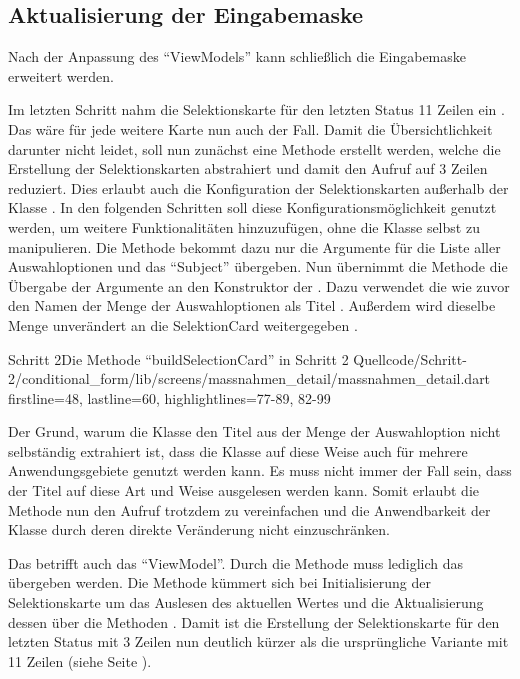 \subsection{Aktualisierung der Eingabemaske}

Nach der Anpassung des \enquote{ViewModels} kann schließlich die Eingabemaske erweitert werden.

Im letzten Schritt nahm die Selektionskarte für den letzten Status 11 Zeilen ein . 
Das wäre für jede weitere Karte nun auch der Fall.
Damit die Übersichtlichkeit darunter nicht leidet, soll nun zunächst eine Methode erstellt werden, welche die Erstellung der Selektionskarten abstrahiert und damit den Aufruf auf 3 Zeilen reduziert.
Dies erlaubt auch die Konfiguration der Selektionskarten außerhalb der Klasse .
In den folgenden Schritten soll diese Konfigurationsmöglichkeit genutzt werden, um weitere Funktionalitäten hinzuzufügen, ohne die Klasse selbst zu manipulieren.
Die Methode  bekommt dazu nur die Argumente für die Liste aller Auswahloptionen   und das \enquote{Subject}   übergeben.
Nun übernimmt die Methode die Übergabe der Argumente an den Konstruktor der .
Dazu verwendet die  wie zuvor den Namen der Menge der Auswahloptionen als Titel .
Außerdem wird dieselbe Menge unverändert an die SelektionCard weitergegeben .

\begin{alexlisting}{Schritt 2}{Die Methode \enquote{buildSelectionCard} in Schritt 2}
  {Quellcode/Schritt-2/conditional_form/lib/screens/massnahmen_detail/massnahmen_detail.dart}
  {firstline=48, lastline=60, highlightlines={77-89, 82-99}}
  \label{lst:Schritt2MassnahmencharakteristikaSelektionskartenWerdenErgaenzt}
\end{alexlisting}

Der Grund, warum die Klasse  den Titel aus der Menge der Auswahloption nicht selbständig extrahiert ist, dass die Klasse auf diese Weise auch für mehrere Anwendungsgebiete genutzt werden kann.
Es muss nicht immer der Fall sein, dass der Titel auf diese Art und Weise ausgelesen werden kann.
Somit erlaubt die Methode  nun den Aufruf trotzdem zu vereinfachen und die Anwendbarkeit der Klasse  durch deren direkte Veränderung nicht einzuschränken.

Das betrifft auch das \enquote{ViewModel}. Durch die Methode  muss lediglich das  übergeben werden. Die Methode kümmert sich bei Initialisierung der Selektionskarte um das Auslesen des aktuellen Wertes  und die Aktualisierung dessen über die Methoden     . Damit ist die Erstellung der Selektionskarte für den letzten Status mit 3 Zeilen \Lst{\ref{lst:Schritt2BuildSelectionCardLetzterStatusChoices}} nun deutlich kürzer als die ursprüngliche Variante mit 11 Zeilen (siehe Seite \pageref{lst:Schritt1AusgabeDerFormularfelder}).

